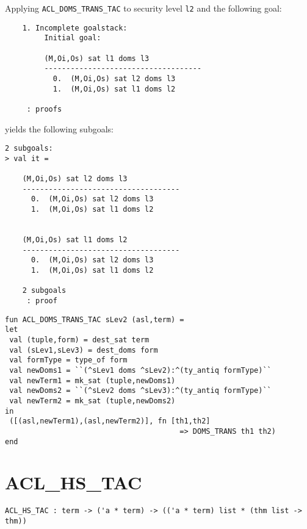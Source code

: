 \EXAMPLE
Applying \texttt{ACL\_DOMS\_TRANS\_TAC} to security level \texttt{l2} and the following goal:
\begin{holboxed}
\begin{verbatim}
    1. Incomplete goalstack:
         Initial goal:
    
         (M,Oi,Os) sat l1 doms l3
         ------------------------------------
           0.  (M,Oi,Os) sat l2 doms l3
           1.  (M,Oi,Os) sat l1 doms l2
    
     : proofs
\end{verbatim}
\end{holboxed}
yields the following subgoals:
\begin{holboxed}
\begin{verbatim}
2 subgoals:
> val it =
    
    (M,Oi,Os) sat l2 doms l3
    ------------------------------------
      0.  (M,Oi,Os) sat l2 doms l3
      1.  (M,Oi,Os) sat l1 doms l2
    
    
    (M,Oi,Os) sat l1 doms l2
    ------------------------------------
      0.  (M,Oi,Os) sat l2 doms l3
      1.  (M,Oi,Os) sat l1 doms l2
    
    2 subgoals
     : proof
\end{verbatim}
\end{holboxed}

\IMPLEMENTATION
\begin{holboxed}
\begin{verbatim}
fun ACL_DOMS_TRANS_TAC sLev2 (asl,term) =
let
 val (tuple,form) = dest_sat term
 val (sLev1,sLev3) = dest_doms form
 val formType = type_of form
 val newDoms1 = ``(^sLev1 doms ^sLev2):^(ty_antiq formType)``
 val newTerm1 = mk_sat (tuple,newDoms1)
 val newDoms2 = ``(^sLev2 doms ^sLev3):^(ty_antiq formType)``
 val newTerm2 = mk_sat (tuple,newDoms2)
in
 ([(asl,newTerm1),(asl,newTerm2)], fn [th1,th2] 
                                        => DOMS_TRANS th1 th2)
end
\end{verbatim}
\end{holboxed}

\SEEALSO
\ENDDOC

\section{ACL\_HS\_TAC}



\small
\begin{lstlisting}[breaklines]
ACL_HS_TAC : term -> ('a * term) -> (('a * term) list * (thm list -> thm))
\end{lstlisting}\egroup

